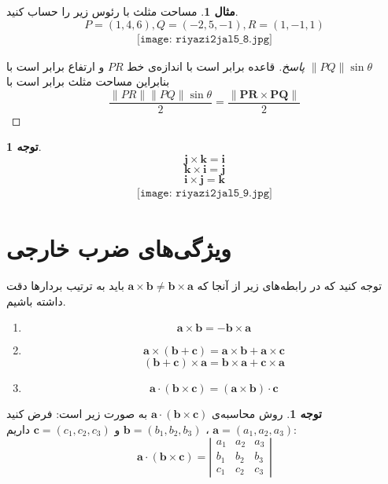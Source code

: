\documentclass[12pt,a4paper]{article}
\theoremstyle{definition}
\newtheorem{mesal}[thm]{مثال}
\newtheorem{tav}[thm]{توجه}
\begin{document}
\begin{mesal}
مساحت مثلث با رئوس زیر را حساب کنید.
\[
P=(1,4,6) , Q=(-2,5,-1), R=(1,-1,1)
\]
\begin{align*}
\texttt{[image: riyazi2jal5\_8.jpg]}
\end{align*}
\end{mesal}
\begin{proof}[پاسخ]
قاعده برابر است با اندازه‌ی خط
$PR$
و ارتفاع برابر است با 
$\|PQ\| \sin \theta$
\\
بنابراین مساحت مثلث برابر است با
\[\frac{\|PR\| \|PQ\| \sin \theta}{2}=\frac{\|\mathbf{PR} \times \mathbf{PQ}\|}{2}\]
\end{proof}
\begin{tav}
\[
\mathbf{j}\times \mathbf{k}=\mathbf{i}
\]
\[
\mathbf{k}\times \mathbf{i}=\mathbf{j}
\]
\[
\mathbf{i}\times \mathbf{j}=\mathbf{k}
\]
\begin{align*}
\texttt{[image: riyazi2jal5\_9.jpg]}
\end{align*}
\end{tav}
\section*{ویژگی‌های ضرب خارجی}
توجه کنید که در رابطه‌های زیر از آنجا که
$\mathbf{a}\times \mathbf{b}\neq \mathbf{b}\times\mathbf{a}$
باید به ترتیب بردارها دقت داشته باشیم.
\begin{enumerate}
\item
\[
\mathbf{a}\times \mathbf{b}=-\mathbf{b}\times \mathbf{a}
\]
\item
\[
\mathbf{a}\times (\mathbf{b}+\mathbf{c})=\mathbf{a}\times \mathbf{b}+\mathbf{a}\times \mathbf{c}
\]
\[
(\mathbf{b}+\mathbf{c}) \times \mathbf{a}=\mathbf{b}\times \mathbf{a}+\mathbf{c}\times \mathbf{a}
\]
\item
\[
\mathbf{a}\cdot (\mathbf{b} \times \mathbf{c})=(\mathbf{a}\times \mathbf{b}) \cdot \mathbf{c}
\]
\end{enumerate}
\begin{tav}
روش محاسبه‌ی
$\mathbf{a}\cdot (\mathbf{b} \times \mathbf{c})$
به صورت زیر است:
فرض کنید 
$\mathbf{a}=(a_1,a_2,a_3)$
،
$\mathbf{b}=(b_1,b_2,b_3)$
و
$\mathbf{c}=(c_1,c_2,c_3)$
داریم:
\[
\mathbf{a} \cdot (\mathbf{b} \times \mathbf{c})=\left|\begin{array}{ccc}
a_1 & a_2 & a_3 \\
b_1 & b_2 & b_3 \\
c_1 & c_2 & c_3
\end{array}
\right|
\]
\end{tav}
\end{document}
